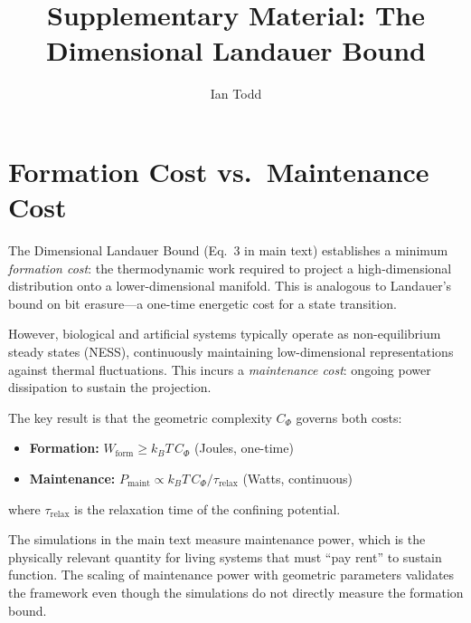 \documentclass[aps,prx,twocolumn,superscriptaddress,floatfix]{revtex4-2}
\begin{document}
\title{Supplementary Material: The Dimensional Landauer Bound}
\author{Ian Todd}

\maketitle

\appendix

\section{Formation Cost vs.\ Maintenance Cost}
\label{app:formation-maintenance}

The Dimensional Landauer Bound (Eq.~3 in main text) establishes a minimum \emph{formation cost}: the thermodynamic work required to project a high-dimensional distribution onto a lower-dimensional manifold. This is analogous to Landauer's bound on bit erasure---a one-time energetic cost for a state transition.

However, biological and artificial systems typically operate as non-equilibrium steady states (NESS), continuously maintaining low-dimensional representations against thermal fluctuations. This incurs a \emph{maintenance cost}: ongoing power dissipation to sustain the projection.

The key result is that the geometric complexity $C_\Phi$ governs both costs:
\begin{itemize}
\item \textbf{Formation:} $W_{\mathrm{form}} \geq k_B T\, C_\Phi$ (Joules, one-time)
\item \textbf{Maintenance:} $P_{\mathrm{maint}} \propto k_B T\, C_\Phi / \tau_{\mathrm{relax}}$ (Watts, continuous)
\end{itemize}
where $\tau_{\mathrm{relax}}$ is the relaxation time of the confining potential.

The simulations in the main text measure maintenance power, which is the physically relevant quantity for living systems that must ``pay rent'' to sustain function. The scaling of maintenance power with geometric parameters validates the framework even though the simulations do not directly measure the formation bound.
\end{document}
